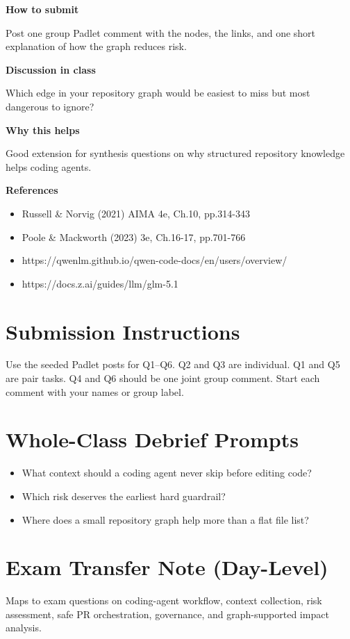 \documentclass[11pt]{article}
\providecommand{\tightlist}{\setlength{\itemsep}{0pt}\setlength{\parskip}{0pt}}
\begin{document}
\begin{tcolorbox}[colback=white,colframe=MidnightBlue,title={Q6 Stretch Extension},fonttitle=\bfseries,breakable]
{\large\bfseries\color{MidnightBlue} How to submit}\par\medskip
Post one group Padlet comment with the nodes, the links, and one short explanation of how the graph reduces risk.

{\large\bfseries\color{MidnightBlue} Discussion in class}\par\medskip
Which edge in your repository graph would be easiest to miss but most dangerous to ignore?

{\large\bfseries\color{MidnightBlue} Why this helps}\par\medskip
Good extension for synthesis questions on why structured repository knowledge helps coding agents.

{\large\bfseries\color{MidnightBlue} References}\par\medskip
\begin{itemize}\item Russell \& Norvig (2021) AIMA 4e, Ch.10, pp.314-343
\item Poole \& Mackworth (2023) 3e, Ch.16-17, pp.701-766
\item https://qwenlm.github.io/qwen-code-docs/en/users/overview/
\item https://docs.z.ai/guides/llm/glm-5.1\end{itemize}
\end{tcolorbox}

\section*{Submission Instructions}

Use the seeded Padlet posts for Q1--Q6. Q2 and Q3 are individual. Q1 and Q5 are pair tasks. Q4 and Q6 should be one joint group comment. Start each comment with your names or group label.

\section*{Whole-Class Debrief Prompts}

\begin{itemize}
\tightlist
\item
  What context should a coding agent never skip before editing code?
\item
  Which risk deserves the earliest hard guardrail?
\item
  Where does a small repository graph help more than a flat file list?
\end{itemize}

\section*{Exam Transfer Note (Day-Level)}

Maps to exam questions on coding-agent workflow, context collection, risk assessment, safe PR orchestration, governance, and graph-supported impact analysis.
\end{document}
